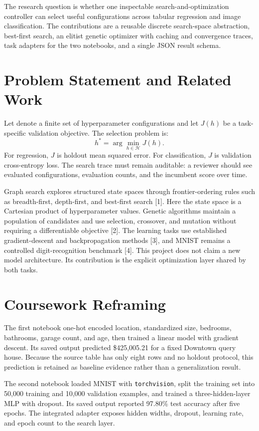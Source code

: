 \documentclass[conference]{IEEEtran}
\begin{document}
The research question is whether one inspectable search-and-optimization controller can select useful configurations across tabular regression and image classification. The contributions are a reusable discrete search-space abstraction, best-first search, an elitist genetic optimizer with caching and convergence traces, task adapters for the two notebooks, and a single JSON result schema.

\section{Problem Statement and Related Work}
Let  denote a finite set of hyperparameter configurations and let $J(h)$ be a task-specific validation objective. The selection problem is:
\begin{equation}
h^{*} = \arg\min_{h \in \mathcal{H}} J(h).
\end{equation}
For regression, $J$ is holdout mean squared error. For classification, $J$ is validation cross-entropy loss. The search trace must remain auditable: a reviewer should see evaluated configurations, evaluation counts, and the incumbent score over time.

Graph search explores structured state spaces through frontier-ordering rules such as breadth-first, depth-first, and best-first search [1]. Here the state space is a Cartesian product of hyperparameter values. Genetic algorithms maintain a population of candidates and use selection, crossover, and mutation without requiring a differentiable objective [2]. The learning tasks use established gradient-descent and backpropagation methods [3], and MNIST remains a controlled digit-recognition benchmark [4]. This project does not claim a new model architecture. Its contribution is the explicit optimization layer shared by both tasks.

\section{Coursework Reframing}
The first notebook one-hot encoded location, standardized size, bedrooms, bathrooms, garage count, and age, then trained a linear model with gradient descent. Its saved output predicted \$425,005.21 for a fixed Downtown query house. Because the source table has only eight rows and no holdout protocol, this prediction is retained as baseline evidence rather than a generalization result.

The second notebook loaded MNIST with \texttt{torchvision}, split the training set into 50,000 training and 10,000 validation examples, and trained a three-hidden-layer MLP with dropout. Its saved output reported 97.80\% test accuracy after five epochs. The integrated adapter exposes hidden widths, dropout, learning rate, and epoch count to the search layer.
\end{document}
